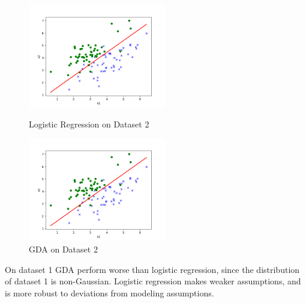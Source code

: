 \begin{answer}
    \begin{figure}[htbp]
        \centering
        \begin{minipage}[t]{0.48\textwidth}
        \centering
        \includegraphics[width=6cm]{../src/output/p01b_pred_2.png}
        \caption{Logistic Regression on Dataset 2}
        \end{minipage}
        \begin{minipage}[t]{0.48\textwidth}
        \centering
        \includegraphics[width=6cm]{../src/output/p01e_pred_2.png}
        \caption{GDA on Dataset 2}
        \end{minipage}
    \end{figure}

    On dataset 1 GDA perform worse than logistic regression, since the distribution of dataset 1 is non-Gaussian. Logistic regression makes 
    weaker assumptions, and is more robust to deviations from modeling assumptions.
\end{answer}
